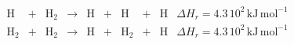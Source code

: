 \begin{equation*}\label{eq:H2diss}
    \begin{array}{lcccccccll}
        \mathrm{H} & + & \mathrm{H}_2   & \rightarrow &\mathrm{H}  & + & \mathrm{H} & + & \mathrm{H} & \Delta H_r = 4.3\,10^{2}\,\mathrm{kJ}\,\mathrm{mol}^{-1} \\
        \mathrm{H}_2  & + & \mathrm{H}_2  & \rightarrow & \mathrm{H} & + &\mathrm{H}_2  & + & \mathrm{H} & \Delta H_r = 4.3\,10^2\,\mathrm{kJ}\,\mathrm{mol}^{-1} \\
    \end{array}
\end{equation*}




